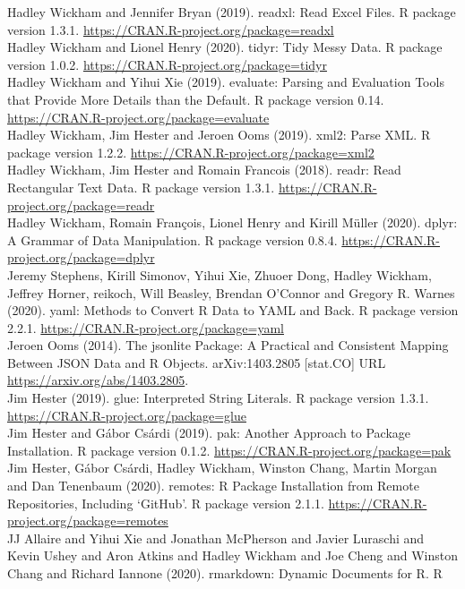 \documentclass[
]{article}
\begin{document}
Hadley Wickham and Jennifer Bryan (2019). readxl: Read Excel Files. R
package version 1.3.1. \url{https://CRAN.R-project.org/package=readxl}\\
Hadley Wickham and Lionel Henry (2020). tidyr: Tidy Messy Data. R
package version 1.0.2. \url{https://CRAN.R-project.org/package=tidyr}\\
Hadley Wickham and Yihui Xie (2019). evaluate: Parsing and Evaluation
Tools that Provide More Details than the Default. R package version
0.14. \url{https://CRAN.R-project.org/package=evaluate}\\
Hadley Wickham, Jim Hester and Jeroen Ooms (2019). xml2: Parse XML. R
package version 1.2.2. \url{https://CRAN.R-project.org/package=xml2}\\
Hadley Wickham, Jim Hester and Romain Francois (2018). readr: Read
Rectangular Text Data. R package version 1.3.1.
\url{https://CRAN.R-project.org/package=readr}\\
Hadley Wickham, Romain François, Lionel Henry and Kirill Müller (2020).
dplyr: A Grammar of Data Manipulation. R package version 0.8.4.
\url{https://CRAN.R-project.org/package=dplyr}\\
Jeremy Stephens, Kirill Simonov, Yihui Xie, Zhuoer Dong, Hadley Wickham,
Jeffrey Horner, reikoch, Will Beasley, Brendan O'Connor and Gregory R.
Warnes (2020). yaml: Methods to Convert R Data to YAML and Back. R
package version 2.2.1. \url{https://CRAN.R-project.org/package=yaml}\\
Jeroen Ooms (2014). The jsonlite Package: A Practical and Consistent
Mapping Between JSON Data and R Objects. arXiv:1403.2805 {[}stat.CO{]}
URL \url{https://arxiv.org/abs/1403.2805}.\\
Jim Hester (2019). glue: Interpreted String Literals. R package version
1.3.1. \url{https://CRAN.R-project.org/package=glue}\\
Jim Hester and Gábor Csárdi (2019). pak: Another Approach to Package
Installation. R package version 0.1.2.
\url{https://CRAN.R-project.org/package=pak}\\
Jim Hester, Gábor Csárdi, Hadley Wickham, Winston Chang, Martin Morgan
and Dan Tenenbaum (2020). remotes: R Package Installation from Remote
Repositories, Including `GitHub'. R package version 2.1.1.
\url{https://CRAN.R-project.org/package=remotes}\\
JJ Allaire and Yihui Xie and Jonathan McPherson and Javier Luraschi and
Kevin Ushey and Aron Atkins and Hadley Wickham and Joe Cheng and Winston
Chang and Richard Iannone (2020). rmarkdown: Dynamic Documents for R. R
\end{document}
